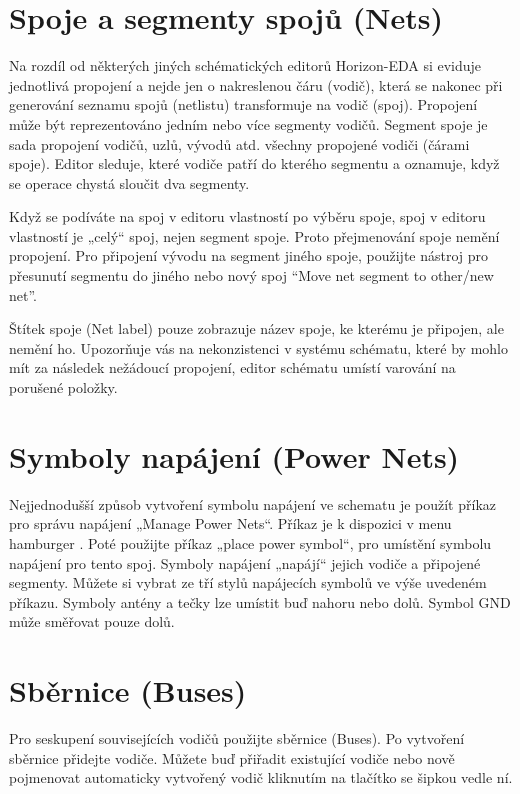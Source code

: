\documentclass[letterpaper,10pt,czech]{sphinxmanual}
\let\sphinxpxdimen\pdfpxdimen\else\newdimen\sphinxpxdimen
\begin{document}
\section{Spoje a segmenty spojů (Nets)}
\label{\detokenize{imp-sch_cz:spoje-a-segmenty-spoju-nets}}
Na rozdíl od některých jiných schématických editorů Horizon-EDA si eviduje jednotlivá propojení a nejde jen o nakreslenou čáru (vodič), která se nakonec při generování seznamu spojů (netlistu) transformuje na vodič (spoj). Propojení může být reprezentováno jedním nebo více segmenty vodičů. Segment spoje je sada propojení vodičů, uzlů, vývodů atd. všechny propojené vodiči (čárami spoje). Editor sleduje, které vodiče patří do kterého segmentu a oznamuje, když se operace chystá sloučit dva segmenty.

Když se podíváte na spoj v editoru vlastností po výběru spoje, spoj v editoru vlastností je „celý“ spoj, nejen segment spoje. Proto přejmenování spoje nemění propojení. Pro připojení vývodu na segment jiného spoje, použijte nástroj pro přesunutí segmentu do jiného nebo nový spoj “Move net segment to other/new net”.

Štítek spoje (Net label) pouze zobrazuje název spoje, ke kterému je připojen, ale nemění ho. Upozorňuje vás na nekonzistenci v systému schématu, které by mohlo mít za následek nežádoucí propojení, editor schématu umístí varování na porušené položky.


\section{Symboly napájení (Power Nets)}
\label{\detokenize{imp-sch_cz:symboly-napajeni-power-nets}}
Nejjednodušší způsob vytvoření symbolu napájení ve schematu je použít příkaz pro správu napájení „Manage Power Nets“. Příkaz je k dispozici v menu hamburger \sphinxincludegraphics[height=10\sphinxpxdimen]{{hamburger}.png}. Poté použijte příkaz „place power symbol“, pro umístění symbolu napájení pro tento spoj. Symboly napájení „napájí“ jejich vodiče a připojené segmenty. Můžete si vybrat ze tří stylů napájecích symbolů ve výše uvedeném příkazu. Symboly antény a tečky
lze umístit buď nahoru nebo dolů. Symbol GND může směřovat pouze dolů.


\section{Sběrnice (Buses)}
\label{\detokenize{imp-sch_cz:sbernice-buses}}
Pro seskupení souvisejících vodičů použijte sběrnice (Buses). Po vytvoření sběrnice přidejte vodiče. Můžete buď přiřadit existující vodiče nebo nově pojmenovat automaticky vytvořený vodič kliknutím na tlačítko se šipkou vedle ní.
\end{document}
